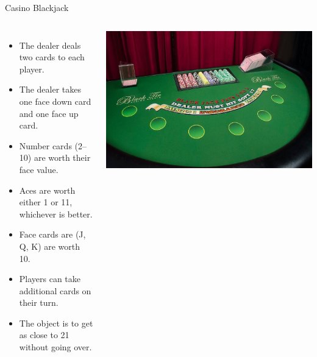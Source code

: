 \documentclass[handout]{beamer}
\newenvironment{code}{%
 \VerbatimEnvironment
 \begin{adjustbox}{max width=\textwidth, max height=0.7\textheight}
 \begin{BVerbatim}
  }{
  \end{BVerbatim}
 \end{adjustbox}
}
\begin{document}
\begin{frame}{Casino Blackjack}
    \begin{columns}
        \begin{itemize}[<+->]
            \item The dealer deals two cards to each player.
            \item The dealer takes one face down card and one face up card.
            \item Number cards (2--10) are worth their face value.
            \item Aces are worth either 1 or 11, whichever is better.
            \item Face cards are (J, Q, K) are worth 10.
            \item Players can take additional cards on their turn.
            \item The object is to get as close to 21 without going over.
        \end{itemize}
        \includegraphics[max width=\textwidth]{images/blackjack}
    \end{columns}
\end{frame}


\end{document}
